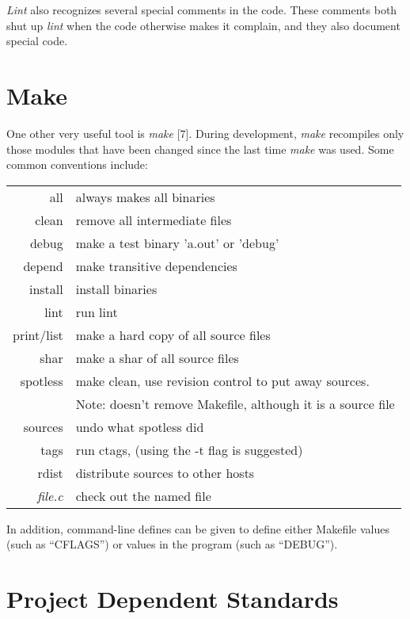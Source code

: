 {\em Lint} also recognizes several special comments in the code. These comments
both shut up {\em lint} when the code otherwise makes it complain, and they also
document special code. 
\newpage
\section{Make}

 One other very useful tool is {\em make} [7]. During development, {\em make}
recompiles only those modules that have been changed since the last time
{\em make} was used. Some common conventions include: 
\vspace{.25in}

\begin{tabular}{r@{--}l}
all & always makes all binaries\\
clean & remove all intermediate files\\
debug & make a test binary 'a.out' or 'debug' \\
depend & make transitive dependencies \\
install & install binaries \\
lint & run lint \\
print/list & make a hard copy of all source files \\
shar & make a shar of all source files \\
spotless & make clean, use revision control to put away sources.  \\
 & Note: doesn't remove Makefile, although it is a source file \\
sources & undo what spotless did \\
tags & run ctags, (using the -t flag is suggested) \\
rdist & distribute sources to other hosts \\
{\em file.c} & check out the named file 
\end{tabular}
\vspace{.25in}

In addition, command-line defines can be given to define either Makefile values
(such as ``CFLAGS'') or values in the program (such as ``DEBUG''). 
\newpage
\section{Project Dependent Standards}

